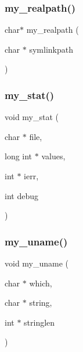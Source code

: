 \subsubsection{\texorpdfstring{my\+\_\+realpath()}{my\_realpath()}}
{\footnotesize\ttfamily char$\ast$ my\+\_\+realpath (\begin{DoxyParamCaption}\item[{char $\ast$}]{symlinkpath }\end{DoxyParamCaption})}

\mbox{\label{C-M__system_8c_a93aa717690d60568cf019988f6434ba5}} 
\subsubsection{\texorpdfstring{my\+\_\+stat()}{my\_stat()}}
{\footnotesize\ttfamily void my\+\_\+stat (\begin{DoxyParamCaption}\item[{char $\ast$}]{file,  }\item[{long int $\ast$}]{values,  }\item[{int $\ast$}]{ierr,  }\item[{int}]{debug }\end{DoxyParamCaption})}

\mbox{\label{C-M__system_8c_ab341d42a9117c4bd188dcdcbff69fe9a}} 
\subsubsection{\texorpdfstring{my\+\_\+uname()}{my\_uname()}}
{\footnotesize\ttfamily void my\+\_\+uname (\begin{DoxyParamCaption}\item[{char $\ast$}]{which,  }\item[{char $\ast$}]{string,  }\item[{int $\ast$}]{stringlen }\end{DoxyParamCaption})}

\mbox{\label{C-M__system_8c_a5dcb7268b2fb47e193fc6bb9519c6ae6}} 
